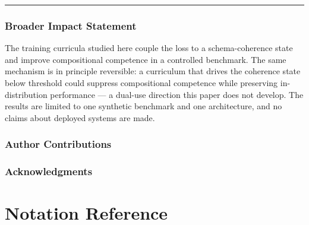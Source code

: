 \documentclass{article}
\theoremstyle{definition}
\begin{document}
\noindent\rule{\linewidth}{0.4pt}

\subsubsection*{Broader Impact Statement}\label{sec:broader-impact}

The training curricula studied here couple the loss to a
schema-coherence state and improve compositional competence in a
controlled benchmark. The same mechanism is in principle reversible: a
curriculum that drives the coherence state below threshold could
suppress compositional competence while preserving in-distribution
performance --- a dual-use direction this paper does not develop. The
results are limited to one synthetic benchmark and one architecture, and
no claims about deployed systems are made.

\subsubsection*{Author Contributions}

\subsubsection*{Acknowledgments}




\clearpage

\appendix
\section{Notation Reference}\label{app:notation}
\end{document}

